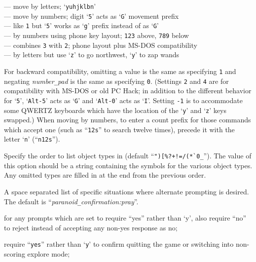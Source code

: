 \newlength{\mwidth}
\settowidth{\mwidth}{\tt -0}
\newcommand{\numbox}[1]{\makebox[\mwidth][r]{{\tt #1}}}
\numbox{0} --- move by letters; `{\tt yuhjklbn}'\\
\numbox{1} --- move by numbers; digit `{\tt 5}' acts as `{\tt G}' movement prefix\\
\numbox{2} --- like {\tt 1} but `{\tt 5}' works as `{\tt g}' prefix instead of as `{\tt G}'\\
\numbox{3} --- by numbers using phone key layout; {\tt 123} above, {\tt 789} below\\
\numbox{4} --- combines {\tt 3} with {\tt 2}; phone layout plus MS-DOS compatibility\\
\numbox{-1} --- by letters but use `{\tt z}' to go northwest, `{\tt y}' to zap wands

For backward compatibility, omitting a value is the same as specifying {\tt 1}
and negating
{\it number\verb+_+pad\/}
is the same as specifying {\tt 0}.
(Settings {\tt 2} and {\tt 4} are for compatibility with MS-DOS or old PC Hack;
in addition to the different behavior for `{\tt 5}', `{\tt Alt-5}' acts as `{\tt G}'
and `{\tt Alt-0}' acts as `{\tt I}'.
Setting {\tt -1} is to accommodate some QWERTZ keyboards which have the
location of the `{\tt y}' and `{\tt z}' keys swapped.)
When moving by numbers, to enter a count prefix for those commands
which accept one (such as ``{\tt 12s}'' to search twelve times), precede it
with the letter `{\tt n}' (``{\tt n12s}'').
\item[\ib{packorder}]
Specify the order to list object types in (default
``\verb&")[%?+!=/(*`0_&''). The value of this option should be a string
containing the symbols for the various object types.  Any omitted types
are filled in at the end from the previous order.
\item[\ib{paranoid\verb+_+confirmation}]
A space separated list of specific situations where alternate
prompting is desired.  The default is ``{\it paranoid\verb+_+confirmation:pray}''.
\newlength{\pcwidth}
\settowidth{\pcwidth}{\tt Were-change}
\addtolength{\pcwidth}{\labelsep}
\blist{\leftmargin \pcwidth \topsep 1mm \itemsep 0mm}
\item[{\tt Confirm}]
for any prompts which are set to require ``yes''
rather than `y', also require ``no'' to reject instead
of accepting any non-yes response as no;
\item[{\tt quit~~~}]
require ``{\tt yes}'' rather than `{\tt y}' to confirm quitting
the game or switching into non-scoring explore mode;
